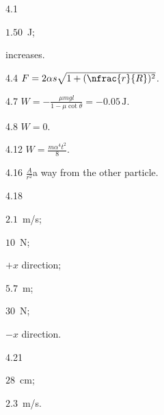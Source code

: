 \protect \section *{\protect {}}
\begin{Solution}{4.{1}}
		\begin{enumerate*}[label=(\alph*)]
			\item $1.50$~J;
			\item increases.
		\end{enumerate*}
	
\end{Solution}
\begin{Solution}{4.{4}}
		$F = 2\alpha s \sqrt{1 + (\nfrac{r}{R})^2}$.
	
\end{Solution}
\begin{Solution}{4.{7}}
		$W = -\frac{\mu mg l}{1 - \mu \cot\theta} = -0.05\,\si{\joule}$.
	
\end{Solution}
\begin{Solution}{4.{8}}
		$W = 0$.
	
\end{Solution}
\begin{Solution}{4.{12}}
		$W = \frac{m\alpha^4t^2}{8}$.
	
\end{Solution}
\begin{Solution}{4.{16}}
		$\frac{A}{r^2}$a way from the other particle.
	
\end{Solution}
\begin{Solution}{4.{18}}
		\begin{enumerate*}[label=(\alph*)]
			\item $2.1$~m/s;
			\item $10$~N;
			\item $+x$ direction;
			\item $5.7$~m;
			\item $30$~N;
			\item $-x$ direction.
		\end{enumerate*}
	
\end{Solution}
\begin{Solution}{4.{21}}
		\begin{enumerate*}[label=(\alph*)]
			\item $28$~cm;
			\item $2.3$~m/s.
		\end{enumerate*}
	
\end{Solution}
